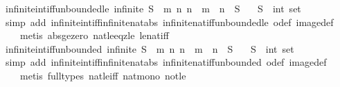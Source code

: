 \begin{isabellebody}
\isamarkupfalse%
%
\endisatagproof
{\isafoldproof}%
%
\isadelimproof
\isanewline
%
\endisadelimproof
\isanewline
{}\isamarkupfalse%
\ infinite{\isacharunderscore}int{\isacharunderscore}iff{\isacharunderscore}unbounded{\isacharunderscore}le{\isacharcolon}\ {\isachardoublequoteopen}infinite\ S\ {\isasymlongleftrightarrow}\ {\isacharparenleft}{\isasymforall}m{\isachardot}\ {\isasymexists}n{\isachardot}\ {\isasymbar}n{\isasymbar}\ {\isasymge}\ m\ {\isasymand}\ n\ {\isasymin}\ S{\isacharparenright}{\isachardoublequoteclose}\isanewline
\ \ \ S\ {\isacharcolon}{\isacharcolon}\ {\isachardoublequoteopen}int\ set{\isachardoublequoteclose}\isanewline
%
\isadelimproof
\ \ %
\endisadelimproof
%
\isatagproof
{}\isamarkupfalse%
\ {\isacharparenleft}simp\ add{\isacharcolon}\ infinite{\isacharunderscore}int{\isacharunderscore}iff{\isacharunderscore}infinite{\isacharunderscore}nat{\isacharunderscore}abs\ infinite{\isacharunderscore}nat{\isacharunderscore}iff{\isacharunderscore}unbounded{\isacharunderscore}le\ o{\isacharunderscore}def\ image{\isacharunderscore}def{\isacharparenright}\isanewline
\ \ \ \ {\isacharparenleft}metis\ abs{\isacharunderscore}ge{\isacharunderscore}zero\ nat{\isacharunderscore}le{\isacharunderscore}eq{\isacharunderscore}zle\ le{\isacharunderscore}nat{\isacharunderscore}iff{\isacharparenright}%
\endisatagproof
{\isafoldproof}%
%
\isadelimproof
\isanewline
%
\endisadelimproof
\isanewline
{}\isamarkupfalse%
\ infinite{\isacharunderscore}int{\isacharunderscore}iff{\isacharunderscore}unbounded{\isacharcolon}\ {\isachardoublequoteopen}infinite\ S\ {\isasymlongleftrightarrow}\ {\isacharparenleft}{\isasymforall}m{\isachardot}\ {\isasymexists}n{\isachardot}\ {\isasymbar}n{\isasymbar}\ {\isachargreater}\ m\ {\isasymand}\ n\ {\isasymin}\ S{\isacharparenright}{\isachardoublequoteclose}\isanewline
\ \ \ S\ {\isacharcolon}{\isacharcolon}\ {\isachardoublequoteopen}int\ set{\isachardoublequoteclose}\isanewline
%
\isadelimproof
\ \ %
\endisadelimproof
%
\isatagproof
{}\isamarkupfalse%
\ {\isacharparenleft}simp\ add{\isacharcolon}\ infinite{\isacharunderscore}int{\isacharunderscore}iff{\isacharunderscore}infinite{\isacharunderscore}nat{\isacharunderscore}abs\ infinite{\isacharunderscore}nat{\isacharunderscore}iff{\isacharunderscore}unbounded\ o{\isacharunderscore}def\ image{\isacharunderscore}def{\isacharparenright}\isanewline
\ \ \ \ {\isacharparenleft}metis\ {\isacharparenleft}full{\isacharunderscore}types{\isacharparenright}\ nat{\isacharunderscore}le{\isacharunderscore}iff\ nat{\isacharunderscore}mono\ not{\isacharunderscore}le{\isacharparenright}%

\end{isabellebody}
